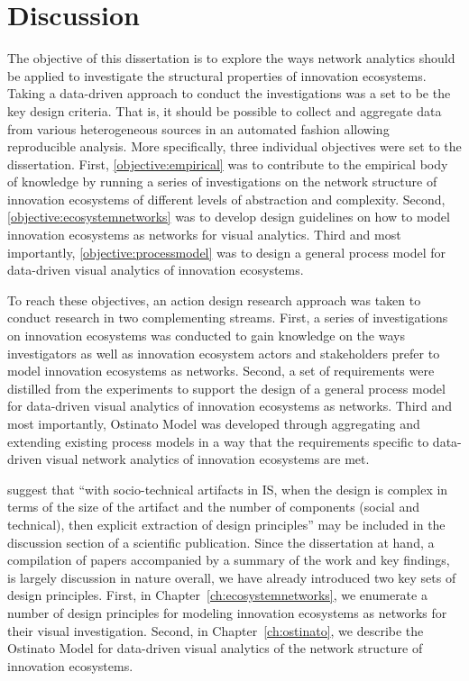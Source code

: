 \chapter{Discussion}
\label{ch:discussion}

The objective of this dissertation is to explore the ways network analytics should be applied to investigate the structural properties of innovation ecosystems. Taking a data-driven approach to conduct the investigations was a set to be the key design criteria. That is, it should be possible to collect and aggregate data from various heterogeneous sources in an automated fashion allowing reproducible analysis. More specifically, three individual objectives were set to the dissertation. First, \ref{objective:empirical} was to contribute to the empirical body of knowledge by running a series of investigations on the network structure of innovation ecosystems of different levels of abstraction and complexity. Second, \ref{objective:ecosystemnetworks} was to develop design guidelines on how to model innovation ecosystems as networks for visual analytics. Third and most importantly, \ref{objective:processmodel} was to design a general process model for data-driven visual analytics of innovation ecosystems.

To reach these objectives, an action design research approach was taken to conduct research in two complementing streams. First, a series of investigations on innovation ecosystems was conducted to gain knowledge on the ways investigators as well as innovation ecosystem actors and stakeholders prefer to model innovation ecosystems as networks. Second, a set of requirements were distilled from the experiments to support the design of a general process model for data-driven visual analytics of innovation ecosystems as networks. Third and most importantly, Ostinato Model was developed through aggregating and extending existing process models in a way that the requirements specific to data-driven visual network analytics of innovation ecosystems are met.

\cite{Gregor2013PositioningImpact} suggest that ``with socio-technical artifacts in IS, when the design is complex in terms of the size of the artifact and the number of components (social and technical), then explicit extraction of design principles'' may be included in the discussion section of a scientific publication. Since the dissertation at hand, a compilation of papers accompanied by a summary of the work and key findings, is largely discussion in nature overall, we have already introduced two key sets of design principles. First, in Chapter~\ref{ch:ecosystemnetworks}, we enumerate a number of design principles for modeling innovation ecosystems as networks for their visual investigation. Second, in Chapter~\ref{ch:ostinato}, we describe the Ostinato Model for data-driven visual analytics of the network structure of innovation ecosystems.

